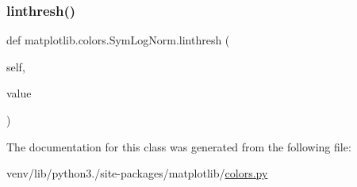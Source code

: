 \mbox{\label{classmatplotlib_1_1colors_1_1SymLogNorm_a5fed092ea45053336306e05e0cb773a0}} 
\subsubsection{\texorpdfstring{linthresh()}{linthresh()}\hspace{0.1cm}{\footnotesize\ttfamily [2/2]}}
{\footnotesize\ttfamily def matplotlib.\+colors.\+Sym\+Log\+Norm.\+linthresh (\begin{DoxyParamCaption}\item[{}]{self,  }\item[{}]{value }\end{DoxyParamCaption})}



The documentation for this class was generated from the following file\+:\begin{DoxyCompactItemize}
\item 
venv/lib/python3./site-\/packages/matplotlib/\hyperlink{colors_8py}{colors.\+py}\end{DoxyCompactItemize}
